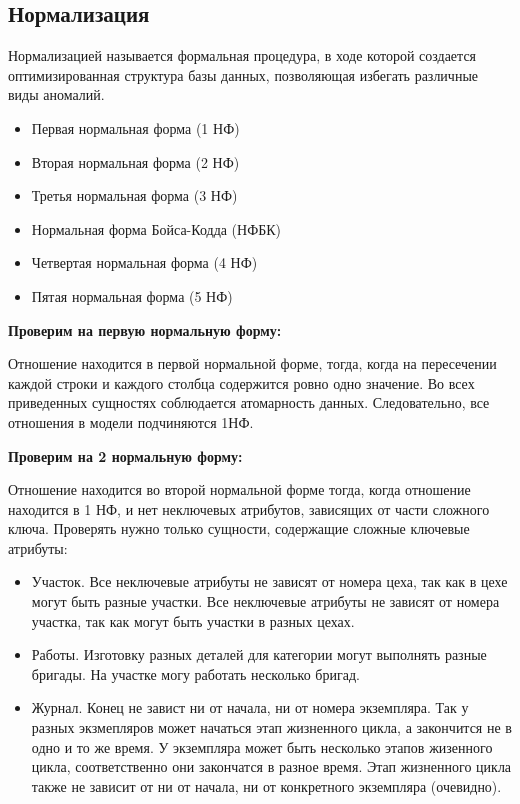 \subsection {Нормализация}
Нормализацией называется формальная процедура, в ходе которой создается оптимизированная структура базы данных, позволяющая избегать различные виды аномалий.

\begin{itemize}
    \item Первая нормальная форма (1 НФ)
    \item Вторая нормальная форма (2 НФ)
    \item Третья нормальная форма (3 НФ)
    \item Нормальная форма Бойса-Кодда (НФБК)
    \item Четвертая нормальная форма (4 НФ)
    \item Пятая нормальная форма (5 НФ)
\end{itemize}

{\bf Проверим на первую нормальную форму:}

Отношение находится в первой нормальной форме, тогда, когда на пересечении каждой строки и каждого столбца содержится ровно одно значение.
Во всех приведенных сущностях соблюдается атомарность данных.
Следовательно, все отношения в модели подчиняются 1НФ.

{\bf Проверим на 2 нормальную форму:}

Отношение находится во второй нормальной форме тогда, когда отношение находится в 1 НФ, и нет неключевых атрибутов, зависящих от части сложного ключа.
Проверять нужно только сущности, содержащие сложные ключевые атрибуты:

\begin{itemize}

    \item Участок.
    Все неключевые атрибуты не зависят от номера цеха, так как в цехе могут быть разные участки.
    Все неключевые атрибуты не зависят от номера участка, так как могут быть участки в разных цехах.

    \item Работы.
    Изготовку разных деталей для категории могут выполнять разные бригады.
    На участке могу работать несколько бригад.

    \item Журнал.
    Конец не завист ни от начала, ни от номера экземпляра.
    Так у разных экзмепляров может начаться этап жизненного цикла, а закончится не в одно и то же время.
    У экземпляра может быть несколько этапов жизенного цикла, соответственно они закончатся в разное время.
    Этап жизненного цикла также не зависит от ни от начала, ни от конкретного экземпляра (очевидно).

\end{itemize}

